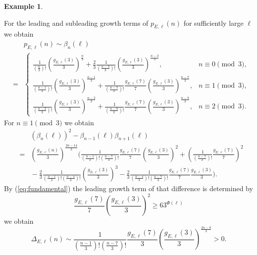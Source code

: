 \documentclass[12pt]{amsart}
\theoremstyle{definition}
\newtheorem{example}{Example}
\theoremstyle{remark}
\numberwithin{theorem}{section} \numberwithin{equation}{section}
\begin{document}
\begin{example}
\begin{enumerate}
For the leading and subleading
growth terms of $p_{E,\ell }\left( n\right) $
for sufficiently large $\ell $
we obtain
\begin{eqnarray*}
&&p_{E,\ell }\left( n\right) \sim \beta _{n}\left( \ell \right) \\
&=&\left\{
\begin{array}{ll}
\frac{1}{\left( \frac{n}{3}\right) !}
\left( \frac{g_{E,\ell }\left( 3\right) }{3}\right) ^{\frac{n}{3}}
+\frac{2}{3}\frac{1}{\left( \frac{n-3}{3}\right) !}
\left( \frac{g_{E,\ell }\left( 3\right) }{3}\right) ^{\frac{n-3}{3}},
&n\equiv 0\pmod{3},\\
\frac{1}{\left( \frac{n-1}{3}\right) !}
\left( \frac{g_{E,\ell }\left( 3\right) }{3}\right) ^{\frac{n-1}{3}}
+\frac{1}{\left( \frac{n-7}{3}\right) !}
\frac{g_{E,\ell }\left( 7\right) }{7}
\left( \frac{g_{E,\ell }\left( 3\right) }{3}\right) ^{\frac{n-7}{3}},
&n\equiv 1\pmod{3},\\
\frac{1}{\left( \frac{n-2}{3}\right) !}
\left( \frac{g_{E,\ell }\left( 3\right) }{3}\right) ^{\frac{n-2}{3}}
+\frac{1}{\left( \frac{n-8}{3}\right) !}
\frac{g_{E,\ell }\left( 7\right) }{7}
\left( \frac{g_{E,\ell }\left( 3\right) }{3}\right) ^{\frac{n-8}{3}},
&n\equiv 2\pmod{3}.
\end{array}
\right.
\end{eqnarray*}
For $n\equiv 1\pmod{3}$
we obtain
\begin{eqnarray*}
&&\left( \beta _{n}\left( \ell \right) \right) ^{2}
-\beta _{n-1}\left( \ell \right) \beta _{n+1}\left( \ell \right) \\
&=&\left( \frac{g_{E,\ell }\left( n\right) }{3}\right) ^{\frac{2n-14}{3}}
( \frac{1}{\left( \frac{n-1}{3}\right) !\left( \frac{n-7}{3}\right) !}
\frac{g_{E,\ell }\left( 7\right) }{7}
\left( \frac{g_{E,\ell }\left( 3\right) }{3}\right) ^{2}
+\left( \frac{1}{\left( \frac{n-7}{3}\right) !}
\frac{g_{E,\ell }\left( 7\right) }{7}\right) ^{2}\\
&&{}-\frac{2}{3}
\frac{1}{\left( \frac{n-1}{3}\right) !\left( \frac{n-4}{3}\right) !}
\left( \frac{g_{E,\ell }\left( 3\right) }{3}\right) ^{3}
-\frac{2}{3}
\frac{1}{\left( \frac{n-4}{3}\right) !\left( \frac{n-7}{3}\right) !}
\frac{g_{E,\ell }\left( 7\right) }{7}\frac{g_{E,\ell }\left( 3\right) }{3}
).
\end{eqnarray*}
By (\ref{eq:fundamental}) the leading growth term of that difference is determined by
\[
\frac{g_{E,\ell }\left( 7\right) }{7}
\left( \frac{g_{E,\ell }\left( 3\right) }{3}\right) ^{2}\geq
63^{\Phi \left( \ell \right) }
\]
we obtain
\[
\Delta _{E,\ell }\left( n\right) \sim
\frac{1}{\left( \frac{n-1}{3}\right) !\left( \frac{n-7}{3}\right) !}
\frac{g_{E,\ell }\left( 7\right) }{3}
\left( \frac{g_{E,\ell }\left( 3\right) }{3}\right) ^{\frac{2
n-8}{3}}>0.
\]


\end{enumerate}
\end{example}
\end{document}
